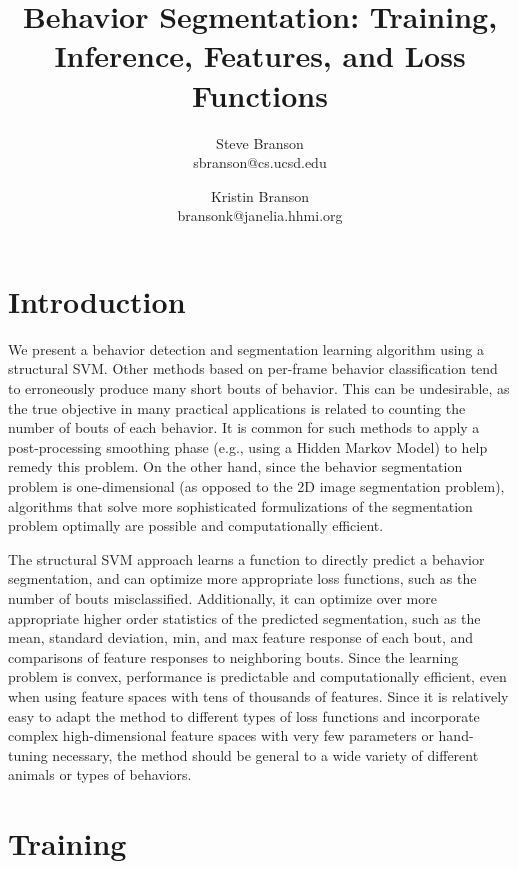 \documentclass[10pt, onecolumn]{article}
\title{Behavior Segmentation: Training, Inference, Features, and Loss Functions}
\author{Steve Branson\\sbranson@cs.ucsd.edu 
\and Kristin Branson\\bransonk@janelia.hhmi.org}
\newcommand{\1}{\textbf{1}}
\begin{document}
\maketitle

\section{Introduction}
We present a behavior detection and segmentation learning algorithm using a structural SVM.  Other methods based on per-frame behavior classification tend to erroneously produce many short bouts of behavior.  This can be undesirable, as the true objective in many practical applications is related to counting the number of bouts of each behavior.  It is common for such methods to apply a post-processing smoothing phase (e.g., using a Hidden Markov Model) to help remedy this problem.  On the other hand, since the behavior segmentation problem is one-dimensional (as opposed to the 2D image segmentation problem), algorithms that solve more sophisticated formulizations of the segmentation problem optimally are possible and computationally efficient.   

The structural SVM approach learns a function to directly predict a behavior segmentation, and can optimize more appropriate loss functions, such as the number of bouts misclassified.  Additionally, it can optimize over more appropriate higher order statistics of the predicted segmentation, such as the mean, standard deviation, min, and max feature response of each bout, and comparisons of feature responses to neighboring bouts.  Since the learning problem is convex, performance is predictable and computationally efficient, even when using feature spaces with tens of thousands of features.  Since it is relatively easy to adapt the method to different types of loss functions and incorporate complex high-dimensional feature spaces with very few parameters or hand-tuning necessary, the method should be general to a wide variety of different animals or types of behaviors.

\section{Training}
\end{document}

